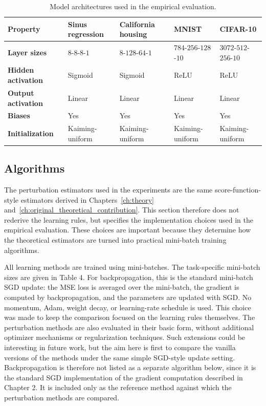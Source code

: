 \begin{table}[!htbp]
\centering
\small
\caption{Model architectures used in the empirical evaluation.}
\label{tab:model_architectures}
\begin{tabularx}{\textwidth}{
    >{\raggedright\arraybackslash}p{2.4cm}
    >{\centering\arraybackslash}X
    >{\centering\arraybackslash}X
    >{\centering\arraybackslash}X
    >{\centering\arraybackslash}X
}
\toprule
\textbf{Property} &
\textbf{Sinus regression} &
\textbf{California housing} &
\textbf{MNIST} &
\textbf{CIFAR-10} \\
\midrule
\textbf{Layer sizes} &
\(8\)-\(8\)-\(8\)-\(1\) &
\(8\)-\(128\)-\(64\)-\(1\) &
\(784\)-\(256\)-\(128\)-\(10\) &
\(3072\)-\(512\)-\(256\)-\(10\) \\
\addlinespace
\textbf{Hidden activation} &
Sigmoid &
Sigmoid &
ReLU &
ReLU \\
\addlinespace
\textbf{Output activation} &
Linear &
Linear &
Linear &
Linear \\
\addlinespace
\textbf{Biases} &
Yes &
Yes &
Yes &
Yes \\
\addlinespace
\textbf{Initialization} &
Kaiming-uniform &
Kaiming-uniform &
Kaiming-uniform &
Kaiming-uniform \\
\bottomrule
\end{tabularx}
\end{table}
\FloatBarrier

\subsection{Algorithms}

The perturbation estimators used in the experiments are the same score-function-style estimators derived in Chapters~\ref{ch:theory} and~\ref{ch:original_theoretical_contribution}. This section therefore does not rederive the learning rules, but specifies the implementation choices used in the empirical evaluation. These choices are important because they determine how the theoretical estimators are turned into practical mini-batch training algorithms.

All learning methods are trained using mini-batches. The task-specific mini-batch sizes are given in Table 4. For backpropagation, this is the standard mini-batch SGD update: the MSE loss is averaged over the mini-batch, the gradient is computed by backpropagation, and the parameters are updated with SGD. No momentum, Adam, weight decay, or learning-rate schedule is used. This choice was made to keep the comparison focused on the learning rules themselves. The perturbation methods are also evaluated in their basic form, without additional optimizer mechanisms or regularization techniques. Such extensions could be interesting in future work, but the aim here is first to compare the vanilla versions of the methods under the same simple SGD-style update setting. Backpropagation is therefore not listed as a separate algorithm below, since it is the standard SGD implementation of the gradient computation described in Chapter 2. It is included only as the reference method against which the perturbation methods are compared.

